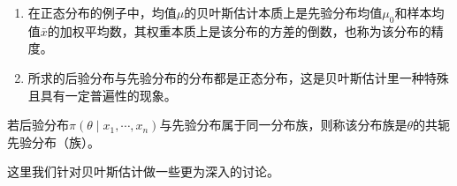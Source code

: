 \begin{remark}
\begin{enumerate}
    \item 在正态分布的例子中，均值$\mu$的贝叶斯估计本质上是先验分布均值$\mu_0$和样本均值$\bar{x}$的加权平均数，其权重本质上是该分布的方差的倒数，也称为该分布的精度。
    \item 所求的后验分布与先验分布的分布都是正态分布，这是贝叶斯估计里一种特殊且具有一定普遍性的现象。
\end{enumerate}
\end{remark}


\begin{definition}
若后验分布$\pi \left(\theta \mid x_{1}, \cdots, x_{n}\right)$与先验分布属于同一分布族，则称该分布族是$\theta$的共轭先验分布（族）。
\end{definition}

这里我们针对贝叶斯估计做一些更为深入的讨论。

